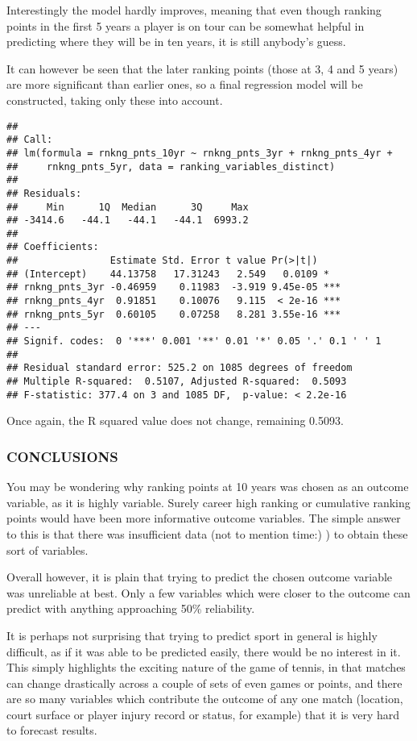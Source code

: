 \documentclass[]{article}
\begin{document}
Interestingly the model hardly improves, meaning that even though
ranking points in the first 5 years a player is on tour can be somewhat
helpful in predicting where they will be in ten years, it is still
anybody's guess.

It can however be seen that the later ranking points (those at 3, 4 and
5 years) are more significant than earlier ones, so a final regression
model will be constructed, taking only these into account.

\begin{verbatim}
## 
## Call:
## lm(formula = rnkng_pnts_10yr ~ rnkng_pnts_3yr + rnkng_pnts_4yr + 
##     rnkng_pnts_5yr, data = ranking_variables_distinct)
## 
## Residuals:
##     Min      1Q  Median      3Q     Max 
## -3414.6   -44.1   -44.1   -44.1  6993.2 
## 
## Coefficients:
##                Estimate Std. Error t value Pr(>|t|)    
## (Intercept)    44.13758   17.31243   2.549   0.0109 *  
## rnkng_pnts_3yr -0.46959    0.11983  -3.919 9.45e-05 ***
## rnkng_pnts_4yr  0.91851    0.10076   9.115  < 2e-16 ***
## rnkng_pnts_5yr  0.60105    0.07258   8.281 3.55e-16 ***
## ---
## Signif. codes:  0 '***' 0.001 '**' 0.01 '*' 0.05 '.' 0.1 ' ' 1
## 
## Residual standard error: 525.2 on 1085 degrees of freedom
## Multiple R-squared:  0.5107, Adjusted R-squared:  0.5093 
## F-statistic: 377.4 on 3 and 1085 DF,  p-value: < 2.2e-16
\end{verbatim}

Once again, the R squared value does not change, remaining 0.5093.

\subsubsection{CONCLUSIONS}\label{conclusions}

You may be wondering why ranking points at 10 years was chosen as an
outcome variable, as it is highly variable. Surely career high ranking
or cumulative ranking points would have been more informative outcome
variables. The simple answer to this is that there was insufficient data
(not to mention time:) ) to obtain these sort of variables.

Overall however, it is plain that trying to predict the chosen outcome
variable was unreliable at best. Only a few variables which were closer
to the outcome can predict with anything approaching 50\% reliability.

It is perhaps not surprising that trying to predict sport in general is
highly difficult, as if it was able to be predicted easily, there would
be no interest in it. This simply highlights the exciting nature of the
game of tennis, in that matches can change drastically across a couple
of sets of even games or points, and there are so many variables which
contribute the outcome of any one match (location, court surface or
player injury record or status, for example) that it is very hard to
forecast results.
\end{document}
